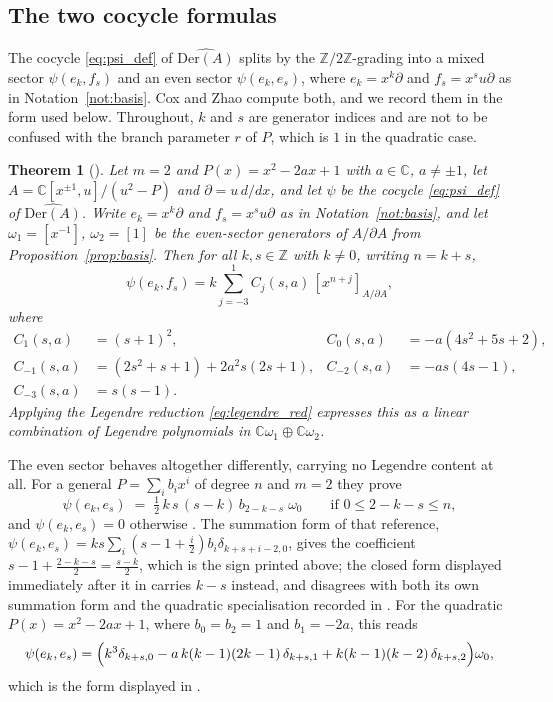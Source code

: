 \documentclass[11pt]{amsart}
\newtheorem{theorem}{Theorem}[section]
\theoremstyle{definition}
\theoremstyle{remark}
\newcommand{\C}{\mathbb{C}}
\newcommand{\Z}{\mathbb{Z}}
\newcommand{\Der}{\mathrm{Der}}
\newcommand{\pa}{\partial}
\newcommand{\hDer}{\widehat{\Der(A)}}
\begin{document}
\subsection{The two cocycle formulas}
\label{subsec:cox_cocycles}

The cocycle \eqref{eq:psi_def} of $\hDer$ splits by the $\Z/2\Z$-grading into
a mixed sector $\psi(e_k,f_s)$ and an even sector $\psi(e_k,e_s)$, where
$e_k=x^k\pa$ and $f_s=x^su\pa$ as in Notation~\ref{not:basis}. Cox and Zhao
compute both, and we record them in the form used below. Throughout, $k$ and
$s$ are generator indices and are not to be confused with the branch parameter
$r$ of $P$, which is $1$ in the quadratic case.

\begin{theorem}[{\cite[\S2.2]{CoxZhao2018}}]
\label{thm:cross_general}
Let $m=2$ and $P(x)=x^2-2ax+1$ with $a\in\C$, $a\neq\pm1$, let
$A=\C[x^{\pm1},u]/(u^2-P)$ and $\pa=u\,d/dx$, and let $\psi$ be the cocycle
\eqref{eq:psi_def} of $\hDer$. Write $e_k=x^k\pa$ and $f_s=x^su\pa$ as in
Notation~\ref{not:basis}, and let $\omega_1=[x^{-1}]$, $\omega_2=[1]$ be the
even-sector generators of $A/\pa A$ from Proposition~\ref{prop:basis}. Then for
all $k,s\in\Z$ with $k\neq0$, writing $n=k+s$,
\begin{equation}\label{eq:cross_general}
  \psi(e_k,f_s) = k\!\sum_{j=-3}^{1} C_j(s,a)\,[x^{n+j}]_{A/\pa A},
\end{equation}
where
\begin{align*}
  C_1(s,a) &= (s+1)^2, &
  C_0(s,a) &= -a(4s^2+5s+2),\\
  C_{-1}(s,a) &= (2s^2+s+1)+2a^2s(2s+1), &
  C_{-2}(s,a) &= -as(4s-1),\\
  C_{-3}(s,a) &= s(s-1).
\end{align*}
Applying the Legendre reduction \eqref{eq:legendre_red} expresses
this as a linear combination of Legendre polynomials in
$\C\omega_1\oplus\C\omega_2$.
\end{theorem}

The even sector behaves altogether differently, carrying no Legendre content
at all. For a general $P=\sum_ib_ix^i$ of degree $n$ and $m=2$ they prove
\begin{equation}\label{eq:ee_sector}
  \psi(e_k,e_s)\;=\;\tfrac12\,k\,s\,(s-k)\,b_{2-k-s}\;\omega_0
  \qquad\text{if } 0\leq 2-k-s\leq n,
\end{equation}
and $\psi(e_k,e_s)=0$ otherwise \cite[(2.1)]{CoxZhao2018}. The summation form of
that reference, $\psi(e_k,e_s)=ks\sum_i(s-1+\tfrac i2)b_i\delta_{k+s+i-2,0}$,
gives the coefficient $s-1+\tfrac{2-k-s}{2}=\tfrac{s-k}{2}$, which is the sign
printed above; the closed form displayed immediately after it in
\cite[(2.1)]{CoxZhao2018} carries $k-s$ instead, and disagrees with both its own
summation form and the quadratic specialisation recorded in
\cite[\S2.2]{CoxZhao2018}. For the quadratic
$P(x)=x^2-2ax+1$, where $b_0=b_2=1$ and $b_1=-2a$, this reads
\[
  \psi(e_k,e_s)=
  \Bigl(k^3\delta_{k+s,0}
        - a\,k(k-1)(2k-1)\,\delta_{k+s,1}
        + k(k-1)(k-2)\,\delta_{k+s,2}\Bigr)\omega_0 ,
\]
which is the form displayed in \cite[\S2.2]{CoxZhao2018}.
\end{document}
